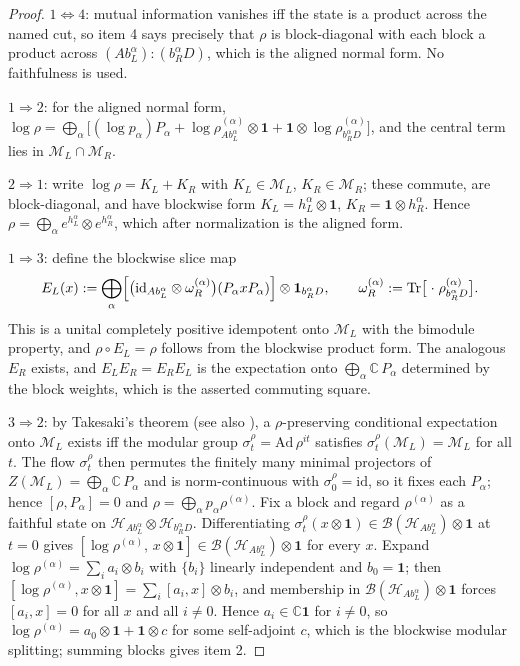 \documentclass[11pt]{article}
\begin{document}
\begin{proof}
\(1\Leftrightarrow 4\): mutual information vanishes iff the state is a product across the named cut, so item 4 says precisely that \(\rho\) is block-diagonal with each block a product across \((Ab_L^\alpha):(b_R^\alpha D)\), which is the aligned normal form. No faithfulness is used.

\(1\Rightarrow 2\): for the aligned normal form,
\(\log\rho=\bigoplus_\alpha\bigl[(\log p_\alpha)P_\alpha+\log\rho^{(\alpha)}_{Ab_L^\alpha}\otimes\mathbf 1+\mathbf 1\otimes\log\rho^{(\alpha)}_{b_R^\alpha D}\bigr]\),
and the central term lies in \(\mathcal M_L\cap\mathcal M_R\).

\(2\Rightarrow 1\): write \(\log\rho=K_L+K_R\) with \(K_L\in\mathcal M_L\), \(K_R\in\mathcal M_R\); these commute, are block-diagonal, and have blockwise form \(K_L=h^\alpha_L\otimes\mathbf 1\), \(K_R=\mathbf 1\otimes h^\alpha_R\). Hence \(\rho=\bigoplus_\alpha e^{h^\alpha_L}\otimes e^{h^\alpha_R}\), which after normalization is the aligned form.

\(1\Rightarrow 3\): define the blockwise slice map
\[
E_L(x):=\bigoplus_\alpha\Bigl[\bigl(\mathrm{id}_{Ab_L^\alpha}\otimes\omega^{(\alpha)}_{R}\bigr)(P_\alpha xP_\alpha)\Bigr]\otimes\mathbf 1_{b_R^\alpha D},
\qquad
\omega^{(\alpha)}_{R}:=\mathrm{Tr}\bigl[\;\cdot\;\rho^{(\alpha)}_{b_R^\alpha D}\bigr].
\]
This is a unital completely positive idempotent onto \(\mathcal M_L\) with the bimodule property, and \(\rho\circ E_L=\rho\) follows from the blockwise product form. The analogous \(E_R\) exists, and \(E_LE_R=E_RE_L\) is the expectation onto \(\bigoplus_\alpha\mathbb C\,P_\alpha\) determined by the block weights, which is the asserted commuting square.

\(3\Rightarrow 2\): by Takesaki's theorem \cite{takesaki72} (see also \cite{petz86,petz88}), a \(\rho\)-preserving conditional expectation onto \(\mathcal M_L\) exists iff the modular group \(\sigma^\rho_t=\mathrm{Ad}\,\rho^{it}\) satisfies \(\sigma^\rho_t(\mathcal M_L)=\mathcal M_L\) for all \(t\). The flow \(\sigma^\rho_t\) then permutes the finitely many minimal projectors of \(Z(\mathcal M_L)=\bigoplus_\alpha\mathbb C\,P_\alpha\) and is norm-continuous with \(\sigma^\rho_0=\mathrm{id}\), so it fixes each \(P_\alpha\); hence \([\rho,P_\alpha]=0\) and \(\rho=\bigoplus_\alpha p_\alpha\rho^{(\alpha)}\). Fix a block and regard \(\rho^{(\alpha)}\) as a faithful state on \(\mathcal H_{Ab_L^\alpha}\otimes\mathcal H_{b_R^\alpha D}\). Differentiating \(\sigma^\rho_t(x\otimes\mathbf 1)\in\mathcal B(\mathcal H_{Ab_L^\alpha})\otimes\mathbf 1\) at \(t=0\) gives \([\log\rho^{(\alpha)},\,x\otimes\mathbf 1]\in\mathcal B(\mathcal H_{Ab_L^\alpha})\otimes\mathbf 1\) for every \(x\). Expand \(\log\rho^{(\alpha)}=\sum_i a_i\otimes b_i\) with \(\{b_i\}\) linearly independent and \(b_0=\mathbf 1\); then \([\log\rho^{(\alpha)},x\otimes\mathbf 1]=\sum_i[a_i,x]\otimes b_i\), and membership in \(\mathcal B(\mathcal H_{Ab_L^\alpha})\otimes\mathbf 1\) forces \([a_i,x]=0\) for all \(x\) and all \(i\neq0\). Hence \(a_i\in\mathbb C\mathbf 1\) for \(i\neq0\), so \(\log\rho^{(\alpha)}=a_0\otimes\mathbf 1+\mathbf 1\otimes c\) for some self-adjoint \(c\), which is the blockwise modular splitting; summing blocks gives item 2.


\end{proof}
\end{document}
